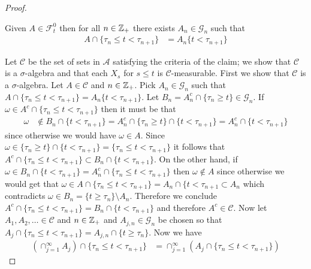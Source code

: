 \begin{proof}
\begin{clm}Given $A \in \mathcal{F}^0_t$ then for all $n \in \mathbb{Z}_+$ there exists $A_n \in \mathcal{G}_n$ such that 
\begin{align*}
A \cap \lbrace \tau_n \leq t < \tau_{n+1} \rbrace 
&= A_n \lbrace t < \tau_{n+1} \rbrace
\end{align*}
\end{clm}
Let $\mathcal{C}$ be the set of sets in $\mathcal{A}$ satisfying the criteria of the claim; we show that $\mathcal{C}$ is a $\sigma$-algebra and that each $X_s$ for $s \leq t$ is 
$\mathcal{C}$-measurable.  First we show that $\mathcal{C}$ is a $\sigma$-algebra.  Let $A \in \mathcal{C}$ and $n \in \mathbb{Z}_+$.  Pick $A_n \in \mathcal{G}_n$ such that
$A \cap \lbrace \tau_n \leq t < \tau_{n+1} \rbrace = A_n \lbrace t < \tau_{n+1} \rbrace$.  Let $B_n = A_n^c \cap \lbrace \tau_n \geq t \rbrace \in \mathcal{G}_n$.    If $\omega \in A^c \cap \lbrace \tau_n \leq t < \tau_{n+1} \rbrace$ then it must be that 
\begin{align*}
\omega &\notin B_n \cap \lbrace t < \tau_{n+1} \rbrace   
= A^c_n \cap \lbrace \tau_n \geq t \rbrace \cap \lbrace t < \tau_{n+1} \rbrace 
= A^c_n  \cap \lbrace t < \tau_{n+1} \rbrace
\end{align*} 
since otherwise we would have $\omega \in A$.  Since $\omega \in  \lbrace \tau_n \geq t \rbrace \cap \lbrace t < \tau_{n+1} \rbrace = \lbrace \tau_n \leq t < \tau_{n+1}\rbrace$ it follows that $A^c \cap \lbrace \tau_n \leq t < \tau_{n+1} \rbrace \subset B_n \cap \lbrace t < \tau_{n+1} \rbrace$.  On the other hand, if $\omega \in B_n \cap \lbrace t < \tau_{n+1} \rbrace = A^c_n \cap \lbrace \tau_n \leq t < \tau_{n+1} \rbrace$ then $\omega \notin A$ since otherwise we would get that $\omega \in A \cap \lbrace \tau_n \leq t < \tau_{n+1} \rbrace = A_n \cap \lbrace t < \tau_{n+1} \subset A_n$ which contradicts $\omega \in B_n = \lbrace t \geq \tau_n \rbrace \setminus A_n$.  Therefore we conclude $A^c \cap \lbrace \tau_n \leq t < \tau_{n+1} \rbrace = B_n \cap \lbrace t < \tau_{n+1} \rbrace$ and therefore $A^c \in \mathcal{C}$.  Now let $A_1, A_2, \dotsc \in \mathcal{C}$ and $n \in \mathbb{Z}_+$ and $A_{j,n} \in \mathcal{G}_n$ be chosen so that $A_j \cap \lbrace \tau_n \leq t < \tau_{n+1} \rbrace = A_{j,n} \cap \lbrace t \geq \tau_n \rbrace$.  Now we have 
\begin{align*}
\left ( \cap_{j=1}^\infty A_j  \right ) \cap \lbrace \tau_n \leq t < \tau_{n+1} \rbrace 
&= \cap_{j=1}^\infty \left ( A_j \cap \lbrace \tau_n \leq t < \tau_{n+1} \rbrace \right) 

\end{align*}
\end{proof}
